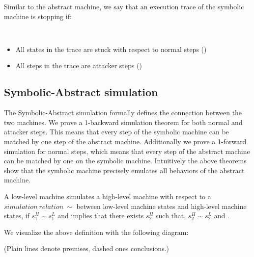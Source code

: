 Similar to the abstract machine, we say that an execution trace of the
symbolic machine is stopping if:

\begin{definition}
\label{symbolic_stopping}
~
\begin{itemize}
\item All states in the trace are stuck with respect to normal steps
  (\stepn{}{})
\item All steps in the trace are attacker steps (\stepa{}{}{})
\end{itemize}
\end{definition}

\subsection{Symbolic-Abstract  simulation}
\label{sec:refinement_SA}

The Symbolic-Abstract simulation formally defines the connection
between the two machines. We prove a 1-backward simulation theorem for
both normal and attacker steps. This means that every step of the
symbolic machine can be matched by one step of the abstract machine.
Additionally we prove a 1-forward simulation for normal steps,
which means that every step of the abstract machine can be matched
by one on the symbolic machine. Intuitively the above theorems show
that the symbolic machine precisely emulates all behaviors of
the abstract machine.


\begin{definition}
\label{simulation_LH}
  A low-level machine simulates a high-level machine with respect to a
  $simulation~relation~\sim$ between low-level machine states and
  high-level machine states, if $s^H_1 \sim s_1^L$ and
   implies that there exists $s^H_2$ such that,
  $s^H_2 \sim s^L_2$ and .

We visualize the above definition with the following diagram:

%
\vspace{-\smallskipamount}
 \begin{center}
  \end{center}
\vspace{-\smallskipamount}
(Plain lines denote premises, dashed ones conclusions.)
\end{definition}

